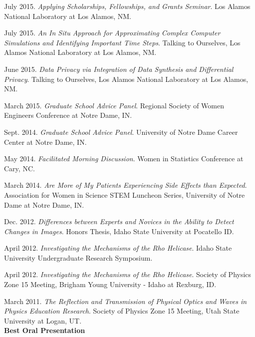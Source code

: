 \documentclass[11pt, letterpaper, roman]{moderncv} %
\begin{document}
\begin{etaremune}[topsep=0pt, itemsep=5pt, partopsep=0pt, parsep=0pt]
  \item July 2015. \textit{Applying Scholarships, Fellowships, and Grants Seminar}. Los Alamos National Laboratory at Los Alamos, NM.
  
  \item July 2015. \textit{An In Situ Approach for Approximating Complex Computer Simulations and Identifying Important Time Steps}. Talking to Ourselves, Los Alamos National Laboratory at Los Alamos, NM.

  \item June 2015. \textit{Data Privacy via Integration of Data Synthesis and Differential Privacy}. Talking to Ourselves, Los Alamos National Laboratory at Los Alamos, NM. 
  
  \item March 2015. \textit{Graduate School Advice Panel}.  Regional Society of Women Engineers Conference at Notre Dame, IN.
  
  \item Sept. 2014. \textit{Graduate School Advice Panel}.  University of Notre Dame Career Center at Notre Dame, IN.
  
  \item May 2014. \textit{Facilitated Morning Discussion}. Women in Statistics Conference at Cary, NC.
  
  \item March 2014. \textit{Are More of My Patients Experiencing Side Effects than Expected}. Association for Women in Science STEM Luncheon Series, University of Notre Dame at Notre Dame, IN.
  
  \item Dec. 2012. \textit{Differences between Experts and Novices in the Ability to Detect Changes in Images}. Honors Thesis, Idaho State University at Pocatello ID.

  \item April 2012. \textit{Investigating the Mechanisms of the Rho Helicase}. Idaho State University Undergraduate Research Symposium.

  \item April 2012. \textit{Investigating the Mechanisms of the Rho Helicase}. Society of Physics Zone 15 Meeting, Brigham Young University - Idaho at Rexburg, ID.

  \item March 2011. \textit{The Reflection and Transmission of Physical Optics and Waves in Physics Education Research}. Society of Physics Zone 15 Meeting, Utah State University at Logan, UT.\\
  \textbf{Best Oral Presentation}
  

\end{etaremune}
\end{document}
